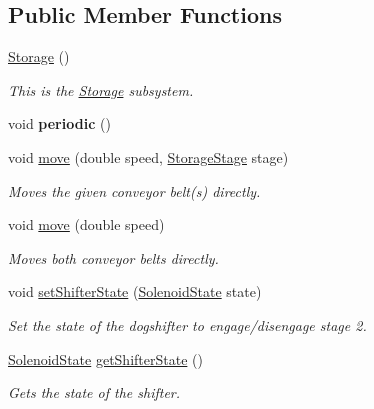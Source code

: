 \subsection*{Public Member Functions}
\begin{DoxyCompactItemize}
\item 
\mbox{\label{classfrc_1_1robot_1_1subsystems_1_1_storage_a4d851dfa2229d5b714fc632fe8e3cce5}} 
\mbox{\hyperlink{classfrc_1_1robot_1_1subsystems_1_1_storage_a4d851dfa2229d5b714fc632fe8e3cce5}{Storage}} ()
\begin{DoxyCompactList}\small\item\em This is the \mbox{\hyperlink{classfrc_1_1robot_1_1subsystems_1_1_storage}{Storage}} subsystem. \end{DoxyCompactList}\item 
\mbox{\label{classfrc_1_1robot_1_1subsystems_1_1_storage_a63bd130d2723e82e946a294373a700b5}} 
void {\bfseries periodic} ()
\item 
void \mbox{\hyperlink{classfrc_1_1robot_1_1subsystems_1_1_storage_a9efeea1d8a13c4a1df74aaf02c6ac466}{move}} (double speed, \mbox{\hyperlink{enumfrc_1_1robot_1_1enums_1_1_storage_stage}{Storage\+Stage}} stage)
\begin{DoxyCompactList}\small\item\em Moves the given conveyor belt(s) directly. \end{DoxyCompactList}\item 
void \mbox{\hyperlink{classfrc_1_1robot_1_1subsystems_1_1_storage_a8fc7f7a8fde529b740a07c606eff02f1}{move}} (double speed)
\begin{DoxyCompactList}\small\item\em Moves both conveyor belts directly. \end{DoxyCompactList}\item 
void \mbox{\hyperlink{classfrc_1_1robot_1_1subsystems_1_1_storage_adb0d9bf991755392eac51b8b723b30e2}{set\+Shifter\+State}} (\mbox{\hyperlink{enumfrc_1_1robot_1_1enums_1_1_solenoid_state}{Solenoid\+State}} state)
\begin{DoxyCompactList}\small\item\em Set the state of the dogshifter to engage/disengage stage 2. \end{DoxyCompactList}\item 
\mbox{\hyperlink{enumfrc_1_1robot_1_1enums_1_1_solenoid_state}{Solenoid\+State}} \mbox{\hyperlink{classfrc_1_1robot_1_1subsystems_1_1_storage_a61cb0ae0e4883d56dd40e226f0984a16}{get\+Shifter\+State}} ()
\begin{DoxyCompactList}\small\item\em Gets the state of the shifter. \end{DoxyCompactList}\end{DoxyCompactItemize}
